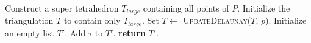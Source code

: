 \documentclass{article}
\begin{document}
\begin{algorithm}
\caption{Constructing a Delaunay Triangulation \\\hspace*{1em}\textbf{Input:} A point set $P$ in $\mathbb{R}^3$.\\\hspace*{1em}\textbf{Output:} A Delaunay triangulation $T$ of $P$.}
\label{alg:construct_delaunay}
\begin{algorithmic}[1]
        \State Construct a super tetrahedron $T_{large}$ containing all points of $P$.
        \State Initialize the triangulation $T$ to contain only $T_{large}$.
            \State Set $T \gets$ \textsc{UpdateDelaunay}($T$, $p$).
        \EndFor
        \State Initialize an empty list $T'$.
                \State Add $\tau$ to $T'$.
            \EndIf
        \EndFor
        \State \textbf{return} $T'$.
    \EndProcedure
\end{algorithmic}
\end{algorithm}
\end{document}
